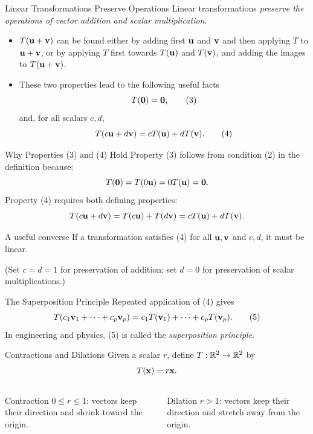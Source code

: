 \begin{frame}{Linear Transformations Preserve Operations}
Linear transformations \textit{preserve the operations of vector addition and scalar multiplication}.

\begin{itemize}
\item $T(\mathbf{u}+\mathbf{v})$ can be found either by adding first $\mathbf{u}$ and $\mathbf{v}$ and then applying
$T$ to $\mathbf{u}+\mathbf{v}$, or by applying $T$ first towards $T(\mathbf{u})$ and $T(\mathbf{v})$, and adding the images to $T(\mathbf{u}+\mathbf{v})$.
\item These two properties lead to the following useful facts
\[
T(\mathbf{0})=\mathbf{0}, \tag{3}
\]
and, for all scalars $c,d$,
\[
T(c\mathbf{u}+d\mathbf{v})=cT(\mathbf{u})+dT(\mathbf{v}). \tag{4}
\]
\end{itemize}
\end{frame}

\begin{frame}{Why Properties (3) and (4) Hold}
Property (3) follows from condition (2) in the definition because:
\[
T(\mathbf{0})=T(0\mathbf{u})=0T(\mathbf{u})=\mathbf{0}.
\]
Property (4) requires both defining properties:
\[
T(c\mathbf{u}+d\mathbf{v})=T(c\mathbf{u})+T(d\mathbf{v})
=cT(\mathbf{u})+dT(\mathbf{v}).
\]
\begin{alertblock}{A useful converse}
If a transformation satisfies (4) for all $\mathbf{u},\mathbf{v}$ and $c,d$, it must be linear.

(Set $c=d=1$ for preservation of addition; set $d=0$ for preservation of scalar multiplications.)
\end{alertblock}
\end{frame}

\begin{frame}{The Superposition Principle}
Repeated application of (4) gives
\[
T(c_1\mathbf{v}_1+\cdots+c_p\mathbf{v}_p)
=c_1T(\mathbf{v}_1)+\cdots+c_pT(\mathbf{v}_p). \tag{5}
\]
In engineering and physics, (5) is called the \emph{superposition principle}.
\end{frame}

\begin{frame}{Contractions and Dilations}
Given a scalar $r$, define $T:\mathbb{R}^2\to\mathbb{R}^2$ by
\[
T(\mathbf{x})=r\mathbf{x}.
\]
\begin{columns}
\begin{block}{Contraction}
$0\le r\le1$: vectors keep their direction and shrink toward the origin.
\end{block}
\begin{block}{Dilation}
$r>1$: vectors keep their direction and stretch away from the origin.
\end{block}
\end{columns}
\begin{center}
\end{center}
\end{frame}


